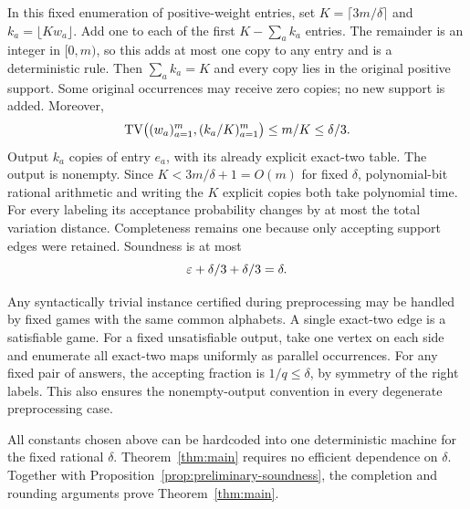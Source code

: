 In this fixed enumeration of positive-weight entries, set
$K=\lceil3m/\delta\rceil$ and $k_a=\lfloor Kw_a\rfloor$.
Add one to each of the first $K-\sum_a k_a$ entries.
The remainder is an integer in $[0,m)$, so this adds at most one copy
to any entry and is a deterministic rule.
Then $\sum_a k_a=K$ and every copy lies in the original positive support.
Some original occurrences may receive zero copies; no new support is added.
Moreover,
\[
 \operatorname{TV}\bigl((w_a)_{a=1}^m,(k_a/K)_{a=1}^m\bigr)
       \le m/K\le\delta/3.
\]
Output $k_a$ copies of entry $e_a$, with its already explicit exact-two table.
The output is nonempty.  Since $K<3m/\delta+1=O(m)$ for fixed
$\delta$, polynomial-bit rational arithmetic and writing the $K$
explicit copies both take polynomial time.
For every labeling its acceptance probability changes by at most the total
variation distance. Completeness remains one because only accepting
support edges were retained. Soundness is at most
\[
                 \varepsilon+\delta/3+\delta/3=\delta.
\]

Any syntactically trivial instance certified during preprocessing may be
handled by fixed games with the same common alphabets.
A single exact-two edge is a satisfiable game.
For a fixed unsatisfiable output, take one vertex on each side and enumerate
all exact-two maps uniformly as parallel occurrences.
For any fixed pair of answers, the accepting fraction is $1/q\le\delta$,
by symmetry of the right labels.
This also ensures the nonempty-output convention in every degenerate
preprocessing case.

All constants chosen above can be hardcoded into one deterministic machine
for the fixed rational $\delta$. Theorem~\ref{thm:main} requires no efficient
dependence on $\delta$.
Together with Proposition~\ref{prop:preliminary-soundness}, the completion
and rounding arguments prove Theorem~\ref{thm:main}.

